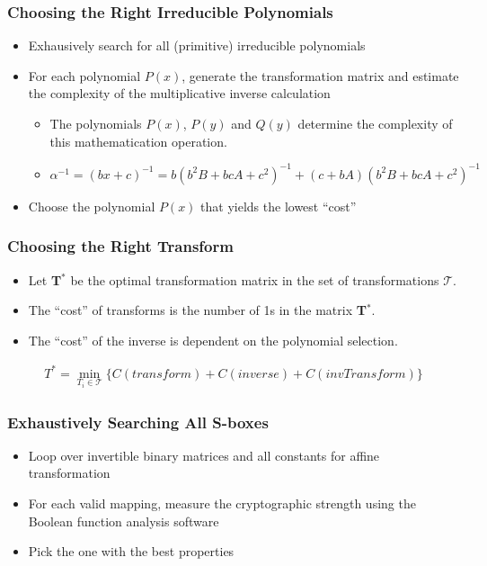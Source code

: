 \documentclass[handout]{beamer}
\begin{document}
\begin{frame}
	\frametitle{Choosing the Right Irreducible Polynomials}
	\begin{itemize}
		\item Exhausively search for all (primitive) irreducible polynomials
		\item For each polynomial $P(x)$, generate the transformation matrix and 
		estimate the complexity of the multiplicative inverse calculation
		\begin{itemize}
			\item The polynomials $P(x)$, $P(y)$ and $Q(y)$ determine the complexity of this mathematication operation.
			\item $\alpha^{-1} = (bx + c)^{-1} = b(b^2B + bcA + c^2)^{-1} + (c + bA)(b^2B + bcA + c^2)^{-1}$
		\end{itemize}
		\item Choose the polynomial $P(x)$ that yields the lowest ``cost'' 
	\end{itemize}
\end{frame}

\begin{frame}
	\frametitle{Choosing the Right Transform}
	\begin{itemize}
		\item Let \textbf{T}$^*$ be the optimal transformation matrix in the set of transformations $\mathcal{T}$.
		\item The ``cost'' of transforms is the number of 1s in the matrix \textbf{T}$^*$. 
		\item The ``cost'' of the inverse is dependent on the polynomial selection.
	\end{itemize}
	\begin{align*}
	T^* = \min_{T_i \in \mathcal{T}}\{C(transform) + C(inverse) + C(invTransform)\}
	\end{align*}
\end{frame}

\begin{frame}
	\frametitle{Exhaustively Searching All S-boxes}
	\begin{itemize}
		\item Loop over invertible binary matrices and all constants for affine transformation
		\item For each valid mapping, measure the cryptographic strength using the Boolean function
		analysis software
		\item Pick the one with the best properties
	\end{itemize}
\end{frame}
\end{document}
